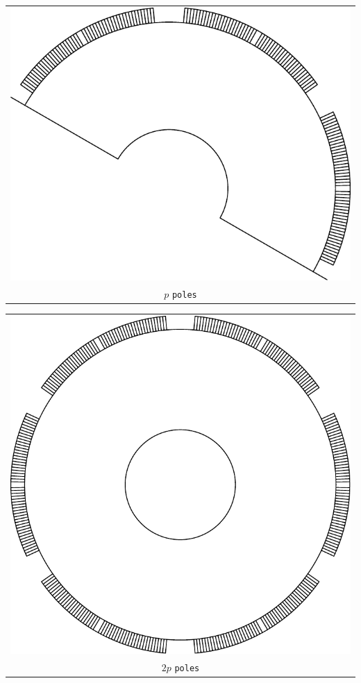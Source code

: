 \documentclass[a4paper,11pt,oneside,fleqn]{report}
\begin{document}
\begin{tabular}{c}
\includegraphics[scale=0.75]{../examples/rotors/ppole} 
\\
$ p $ \texttt{poles}
\end{tabular}
\vspace{5mm}

\begin{tabular}{c}
\includegraphics[scale=0.75]{../examples/rotors/2ppole} 
\\
$ 2p $ \texttt{poles}
\end{tabular}
\end{document}
